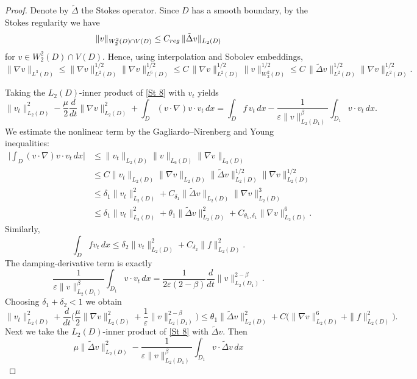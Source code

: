 \documentclass[10pt,a4paper]{amsart}
\begin{document}
\begin{proof} %
	Denote by $\tilde\Delta $ the Stokes operator.  
Since $D$ has a smooth boundary, by the Stokes regularity we have
	\[
	\|v\|_{W^2_2(D)\cap V(D)} \le C_{\rm reg}\,\|\tilde\Delta v\|_{L_2(D)}
	\]
for $v\in W^2_2(D)\cap V(D)$.
	Hence, using interpolation and Sobolev embeddings,
	\[
	\|\nabla v\|_{L^3(D)} \le \|\nabla v\|_{L^2(D)}^{1/2}\|\nabla v\|_{L^6(D)}^{1/2}
	\le C\,\|\nabla v\|_{L^2(D)}^{1/2}\|v\|_{W^2_2(D)}^{1/2}
	\le C\,\|\tilde\Delta v\|_{L^2(D)}^{1/2}\|\nabla v\|_{L^2(D)}^{1/2}.
	\]
	
	Taking the $L_2(D)$-inner product of \eqref{St 8} with $v_t$  yields
	\[
	\|v_t\|_{L_2(D)}^2 - \frac{\mu}{2}\frac{d}{dt}\|\nabla v\|_{L_2(D)}^2
	+ \int_D (v\cdot\nabla)v\cdot v_t\,dx
	= \int_D f\,v_t\,dx - \frac{1}{\varepsilon\|v\|_{L_2(D_1)}^\beta}\int_{D_1} v\cdot v_t\,dx.
	\]
We estimate the nonlinear term by the Gagliardo--Nirenberg and Young inequalities:
	\[
	\begin{aligned}
		\Big|\int_D (v\cdot\nabla)v\cdot v_t\,dx\Big|
		&\le \|v_t\|_{L_2(D)}\|v\|_{L_6(D)}\|\nabla v\|_{L_3(D)} \\
		&\le C\|v_t\|_{L_2(D)}\|\nabla v\|_{L_2(D)}\|\tilde\Delta v\|_{L_2(D)}^{1/2}\|\nabla v\|_{L_2(D)}^{1/2} \\
		&\le \delta_1\|v_t\|_{L_2(D)}^2 + C_{\delta_1}\|\tilde\Delta v\|_{L_2(D)}\|\nabla v\|_{L_2(D)}^3 \\
		&\le \delta_1\|v_t\|_{L_2(D)}^2 + \theta_1\|\tilde\Delta v\|_{L_2(D)}^2 + C_{\theta_1,{\delta_1}}\|\nabla v\|_{L_2(D)}^6.
	\end{aligned}
	\]
	Similarly,
	\[
	\int_D f v_t \,dx \le \delta_2\|v_t\|_{L_2(D)}^2 + C_{\delta_2}\|f\|_{L_2(D)}^2.
	\]
	The damping-derivative term is exactly
	\[
	\frac{1}{\varepsilon\|v\|_{L_2(D_1)}^\beta}\int_{D_1} v\cdot v_t\,dx
	= \frac{1}{2\varepsilon(2-\beta)}\frac{d}{dt}\|v\|_{L_2(D_1)}^{2-\beta}.
	\]
	Choosing $\delta_1+\delta_2<1$ we obtain
	\begin{equation}\label{St 17}
		\|v_t\|_{L_2(D)}^2 + \frac{d}{dt}\Big({\frac\mu2}\|\nabla v\|_{L_2(D)}^2 + \frac{1}{\varepsilon}\|v\|_{L_2(D_1)}^{2-\beta}\Big)
		\le \theta_1\|\tilde\Delta v\|_{L_2(D)}^2 + C\big(\|\nabla v\|_{L_2(D)}^6 + \|f\|_{L_2(D)}^2\big).
	\end{equation}
	Next we take the $L_2(D)$-inner product of \eqref{St 8} with $\tilde\Delta v$.
 Then
	\[
	{\mu}\|\tilde\Delta v\|_{L_2(D)}^2 - \frac{1}{\varepsilon\|v\|_{L_2(D_1)}^\beta}\int_{D_1} v\cdot\tilde\Delta v\,dx
\]
\end{proof}
\end{document}
